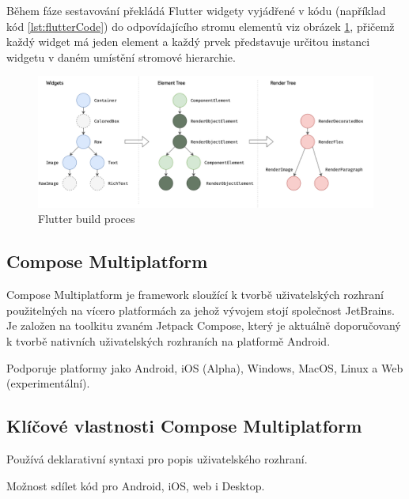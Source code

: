 Během fáze sestavování překládá Flutter widgety vyjádřené v kódu (například kód \ref{lst:flutterCode}) do odpovídajícího stromu elementů viz obrázek \ref{fig:flutter_trees}, přičemž každý widget má jeden element a 
každý prvek představuje určitou instanci widgetu v daném umístění stromové hierarchie. \cite*{flutterArchOverview}


\begin{figure}[H]
  \centering
  \includegraphics[width=1\textwidth]{flutter_trees.png}
  \caption{Flutter build proces}
  \label{fig:flutter_trees}
\end{figure}



\subsection{Compose Multiplatform}

Compose Multiplatform je framework sloužící k tvorbě uživatelských rozhraní použitelných na vícero platformách za 
jehož vývojem stojí společnost JetBrains. \cite{composeMultiplatform} Je založen na toolkitu zvaném Jetpack Compose, který je aktuálně 
doporučovaný k tvorbě nativních uživatelských rozhraních na platformě Android. \cite{jetpack}

Podporuje platformy jako Android, iOS (Alpha), Windows, MacOS, Linux a Web (experimentální). \cite{composeMultiplatform}

\medskip

\subsection*{Klíčové vlastnosti Compose Multiplatform}

Používá deklarativní syntaxi pro popis uživatelského rozhraní. \cite{KMPUseCases}

Možnost sdílet kód pro Android, iOS, web i Desktop.


